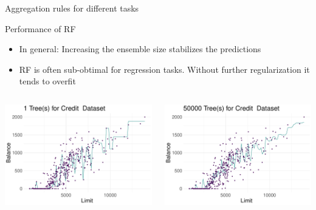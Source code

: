 \documentclass[11pt,compress,t,notes=noshow, xcolor=table]{beamer}
\begin{document}
\begin{vbframe}{Aggregation rules for different tasks}
\end{vbframe}


\begin{vbframe}{Performance of RF}
\begin{itemize}
\item \small In general: Increasing the ensemble size stabilizes the predictions
\item \small RF is often sub-obtimal for regression tasks. Without further regularization it tends to overfit 
\end{itemize}
\begin{columns}  
\begin{column}{0.5\textwidth} 
\begin{center}
 \includegraphics[width = 1\textwidth]{slides/forests/figure/nutshell_forest_ensemblesize_1.pdf}
 \end{center}
\end{column}
\begin{column}{0.5\textwidth} 
\begin{center}
  \includegraphics[width = 1\textwidth]{slides/forests/figure/nutshell_forest_ensemblesize_3.pdf}
\end{center}
\end{column}
\end{columns}

\end{vbframe}
\end{document}
